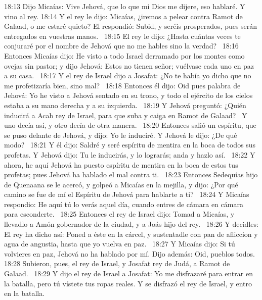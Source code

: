 																		18:13 Dijo Micaías: Vive Jehová, que lo que mi Dios me dijere, eso hablaré. Y vino al rey. 
																		18:14 Y el rey le dijo: Micaías, ¿iremos a pelear contra Ramot de Galaad, o me estaré quieto? El respondió: Subid, y seréis prosperados, pues serán entregados en vuestras manos.  
																		18:15 El rey le dijo: ¿Hasta cuántas veces te conjuraré por el nombre de Jehová que no me hables sino la verdad?  
																		18:16 Entonces Micaías dijo: He visto a todo Israel derramado por los montes como ovejas sin pastor; y dijo Jehová: Estos no tienen señor; vuélvase cada uno en paz a su casa.  
																		18:17 Y el rey de Israel dijo a Josafat: ¿No te había yo dicho que no me profetizaría bien, sino mal?  
																		18:18 Entonces él dijo: Oid pues palabra de Jehová: Yo he visto a Jehová sentado en su trono, y todo el ejército de los cielos estaba a su mano derecha y a su izquierda.  
																		18:19 Y Jehová preguntó: ¿Quién inducirá a Acab rey de Israel, para que suba y caiga en Ramot de Galaad?  Y uno decía así, y otro decía de otra manera.  
																		18:20 Entonces salió un espíritu, que se puso delante de Jehová, y dijo: Yo le induciré. Y Jehová le dijo: ¿De qué modo?  
																		18:21 Y él dijo: Saldré y seré espíritu de mentira en la boca de todos sus profetas. Y Jehová dijo: Tu le inducirás, y lo lograrás; anda y hazlo así.  
																		18:22 Y ahora, he aquí Jehová ha puesto espíritu de mentira en la boca de estos tus profetas; pues Jehová ha hablado el mal contra ti.  
																		18:23 Entonces Sedequías hijo de Quenaana se le acercó, y golpeó a Micaías en la mejilla, y dijo: ¿Por qué camino se fue de mí el Espíritu de Jehová para hablarte a ti?  
																		18:24 Y Micaías respondio: He aquí tú lo verás aquel día, cuando entres de cámara en cámara para esconderte.  
																		18:25 Entonces el rey de Israel dijo: Tomad a Micaías, y llevadlo a Amón gobernador de la ciudad, y a Joás hijo del rey.  
																		18:26 Y decidles: El rey ha dicho así: Poned a éste en la cárcel, y sustentadle con pan de afliccion y agua de angustia, hasta que yo vuelva en paz.  
																		18:27 Y Micaías dijo: Si tú volvieres en paz, Jehová no ha hablado por mí. Dijo además: Oid, pueblos todos.  
																		18:28 Subieron, pues, el rey de Israel, y Josafat rey de Judá, a Ramot de Galaad.  
																		18:29 Y dijo el rey de Israel a Josafat: Yo me disfrazaré para entrar en la batalla, pero tú vístete tus ropas reales. Y se disfrazó el rey de Israel, y entro en la batalla.  
